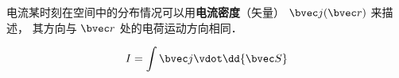 
\begin{issues}
\issueDraft
\end{issues}


电流某时刻在空间中的分布情况可以用\textbf{电流密度}（矢量） $\bvec j(\bvec r)$ 来描述， 其方向与 $\bvec r$ 处的电荷运动方向相同．


\begin{equation}
I = \int \bvec j \vdot \dd{\bvec S}
\end{equation}

